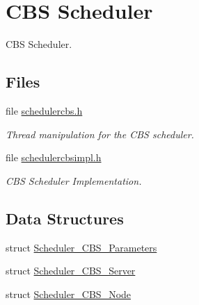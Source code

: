 \hypertarget{group__RTEMSScoreSchedulerCBS}{}\section{C\+BS Scheduler}
\label{group__RTEMSScoreSchedulerCBS}


C\+BS Scheduler.  


\subsection*{Files}
\begin{DoxyCompactItemize}
\item 
file \mbox{\hyperlink{schedulercbs_8h}{schedulercbs.\+h}}
\begin{DoxyCompactList}\small\item\em Thread manipulation for the C\+BS scheduler. \end{DoxyCompactList}\item 
file \mbox{\hyperlink{schedulercbsimpl_8h}{schedulercbsimpl.\+h}}
\begin{DoxyCompactList}\small\item\em C\+BS Scheduler Implementation. \end{DoxyCompactList}\end{DoxyCompactItemize}
\subsection*{Data Structures}
\begin{DoxyCompactItemize}
\item 
struct \mbox{\hyperlink{structScheduler__CBS__Parameters}{Scheduler\+\_\+\+C\+B\+S\+\_\+\+Parameters}}
\item 
struct \mbox{\hyperlink{structScheduler__CBS__Server}{Scheduler\+\_\+\+C\+B\+S\+\_\+\+Server}}
\item 
struct \mbox{\hyperlink{structScheduler__CBS__Node}{Scheduler\+\_\+\+C\+B\+S\+\_\+\+Node}}
\end{DoxyCompactItemize}
